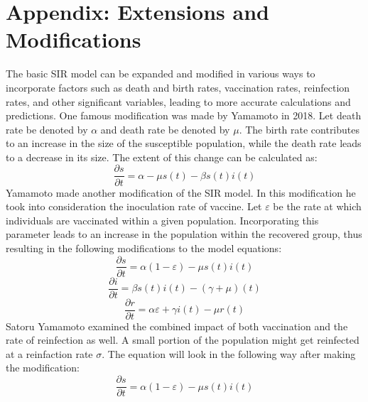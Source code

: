 \section{Appendix: Extensions and Modifications}\label{appendix-a}\thispagestyle{SectionFirstPage} %
\setcounter{figure}{0}
\setcounter{table}{0}
\hspace{\parindent}The basic SIR model can be expanded and modified in various ways to incorporate factors such as death and birth rates, vaccination rates, reinfection rates, and other significant variables, leading to more accurate calculations and predictions.
One famous modification was made by Yamamoto in 2018.
Let death rate be denoted by $\alpha$ and death rate be denoted by $\mu$.
The birth rate contributes to an increase in the size of the susceptible population, while the death rate leads to a decrease in its size.
The extent of this change can be calculated as:
\begin{equation*}
    \frac{\partial s}{\partial t} = \alpha - \mu s(t) - \beta s(t)i(t)
\end{equation*}
\hspace{\parindent}Yamamoto made another modification of the SIR model.
In this modification he took into consideration the inoculation rate of vaccine.
Let $\varepsilon$ be the rate at which individuals are vaccinated within a given population.
Incorporating this parameter leads to an increase in the population within the recovered group, thus resulting in the following modifications to the model equations:
\begin{equation*}
    \frac{\partial s}{\partial t} = \alpha(1 - \varepsilon) - \mu s(t)i(t)
\end{equation*}
\begin{equation*}
    \frac{\partial i}{\partial t} = \beta s(t)i(t) - (\gamma + \mu)(t)
\end{equation*}
\begin{equation*}
    \frac{\partial r}{\partial t} = \alpha\varepsilon + \gamma i(t) - \mu r(t)
\end{equation*}
\hspace{\parindent}Satoru Yamamoto examined the combined impact of both vaccination and the rate of reinfection as well.
A small portion of the population might get reinfected at a reinfaction rate $\sigma$.
The equation will look in the following way after making the modification:
\begin{equation*}
    \frac{\partial s}{\partial t} = \alpha(1 - \varepsilon) - \mu s(t)i(t)
\end{equation*}
